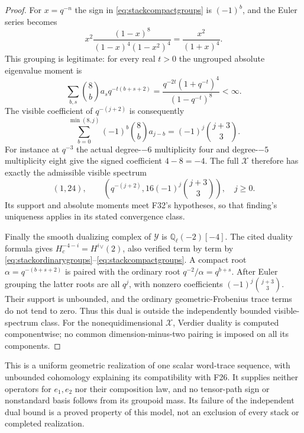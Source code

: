 \documentclass[11pt,a4paper]{article}
\newcommand{\Q}{\mathbb Q}\newcommand{\Z}{\mathbb Z}\newcommand{\C}{\mathbb C}\newcommand{\N}{\mathbb N}\newcommand{\F}{\mathbb F}
\newcommand{\fid}[1]{\textsf{#1}}\newcommand{\gate}[1]{\textsf{#1}}
\theoremstyle{named}\newtheorem{finding}{Finding}[section]
\theoremstyle{definition}\newtheorem{definition}[finding]{Definition}
\theoremstyle{remark}\newtheorem{remark}[finding]{Remark}
\begin{document}
\begin{proof}
For $x=q^{-n}$ the sign in \eqref{eq:stackcompactgroups} is
$(-1)^b$, and the Euler series becomes
\[
 x^2\frac{(1-x)^8}{(1-x)^4(1-x^2)^4}
 =\frac{x^2}{(1+x)^4}.
\]
This grouping is legitimate: for every real $t>0$ the ungrouped
absolute eigenvalue moment is
\[
 \sum_{b,s}\binom8b a_s q^{-t(b+s+2)}
 =\frac{q^{-2t}(1+q^{-t})^4}{(1-q^{-t})^8}<\infty.
\]
The visible coefficient of $q^{-(j+2)}$ is consequently
\[
 \sum_{b=0}^{\min(8,j)}(-1)^b\binom8b a_{j-b}
   =(-1)^j\binom{j+3}{3}.
\]
For instance at $q^{-3}$ the actual degree-$-6$ multiplicity four
and degree-$-5$ multiplicity eight give the signed coefficient
$4-8=-4$. The full $\mathcal X$ therefore has exactly the
admissible visible spectrum
\[
 (1,24),\qquad
 \left(q^{-(j+2)},16(-1)^j\binom{j+3}{3}\right),\quad j\ge0.
\]
Its support and absolute moments meet \fid{F32}'s hypotheses, so
that finding's uniqueness applies in its stated convergence class.

Finally the smooth dualizing complex of $\mathcal Y$ is
$\Q_\ell(-2)[-4]$. The cited duality formula gives
$H_c^{-4-i}=H^i{}^\vee(2)$, also verified term by term by
\eqref{eq:stackordinarygroups}--\eqref{eq:stackcompactgroups}.
A compact root $\alpha=q^{-(b+s+2)}$ is paired with the
ordinary root $q^{-2}/\alpha=q^{b+s}$. After Euler grouping
the latter roots are all $q^j$, with nonzero coefficients
$(-1)^j\binom{j+3}{3}$. Their support is unbounded, and the
ordinary geometric-Frobenius trace terms do not tend to zero.
Thus this dual is outside the independently bounded visible-spectrum
class. For the nonequidimensional $\mathcal X$, Verdier duality
is computed componentwise; no common dimension-minus-two pairing
is imposed on all its components.
\end{proof}

This is a uniform geometric realization of one scalar word-trace
sequence, with unbounded cohomology explaining its compatibility
with \fid{F26}. It supplies neither operators for $e_1,e_2$ nor
their composition law, and no tensor-path sign or nonstandard basis
follows from its groupoid mass. Its failure of the independent dual
bound is a proved property of this model, not an exclusion of every
stack or completed realization.
\end{document}

